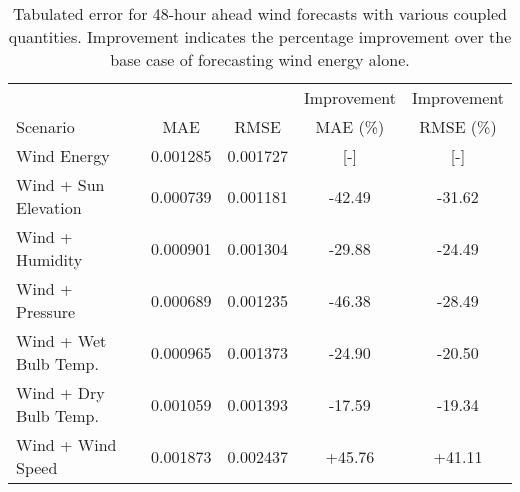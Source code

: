   \begin{table*}[b]
    \centering
    \caption{Tabulated error for 48-hour ahead wind forecasts with various coupled quantities. Improvement indicates the percentage improvement over the base case of forecasting wind energy alone.}
    \label{tab:wind48}
    \begin{tabular}{l|c|c|c|c}
      &  & & Improvement & Improvement \\
      Scenario  & MAE & RMSE & MAE (\%) & RMSE (\%)\\
      \hline
      Wind Energy & 0.001285 & 0.001727 & [-] & [-] \\
      Wind + Sun Elevation & 0.000739 & 0.001181 & -42.49& -31.62\\
      Wind + Humidity & 0.000901 & 0.001304 & -29.88& -24.49\\
      Wind + Pressure & 0.000689 & 0.001235 & -46.38& -28.49\\
      Wind + Wet Bulb Temp. & 0.000965 & 0.001373 & -24.90& -20.50\\
      Wind + Dry Bulb Temp. & 0.001059 & 0.001393 & -17.59& -19.34\\
      Wind + Wind Speed & 0.001873 & 0.002437 & +45.76& +41.11\\
    \end{tabular}
  \end{table*}
